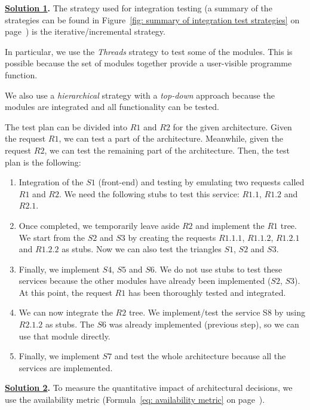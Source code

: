 \solution
\textbf{\underline{Solution 1}.} The strategy used for integration testing (a summary of the strategies can be found in Figure~\ref{fig: summary of integration test strategies} on page~\pageref{fig: summary of integration test strategies}) is the iterative/incremental strategy.

In particular, we use the \emph{Threads} strategy to test some of the modules. This is possible because the set of modules together provide a user-visible programme function.

We also use a \emph{hierarchical} strategy with a \emph{top-down} approach because the modules are integrated and all functionality can be tested.

The test plan can be divided into $R1$ and $R2$ for the given architecture. Given the request $R1$, we can test a part of the architecture. Meanwhile, given the request $R2$, we can test the remaining part of the architecture. Then, the test plan is the following:
\begin{enumerate}
    \item Integration of the $S1$ (front-end) and testing by emulating two requests called $R1$ and $R2$. We need the following stubs to test this service: $R1.1$, $R1.2$ and $R2.1$.

    \item Once completed, we temporarily leave aside $R2$ and implement the $R1$ tree. We start from the $S2$ and $S3$ by creating the requests $R1.1.1$, $R1.1.2$, $R1.2.1$ and $R1.2.2$ as stubs. Now we can also test the triangles $S1$, $S2$ and $S3$.

    \item Finally, we implement $S4$, $S5$ and $S6$. We do not use stubs to test these services because the other modules have already been implemented ($S2$, $S3$). At this point, the request $R1$ has been thoroughly tested and integrated.

    \item We can now integrate the $R2$ tree. We implement/test the service S8 by using $R2.1.2$ as stubs. The $S6$ was already implemented (previous step), so we can use that module directly.
    
    \item Finally, we implement $S7$ and test the whole architecture because all the services are implemented.
\end{enumerate}

\highspace
\textbf{\underline{Solution 2}.} To measure the quantitative impact of architectural decisions, we use the availability metric (Formula~\ref{eq: availability metric} on page~\pageref{eq: availability metric}).


